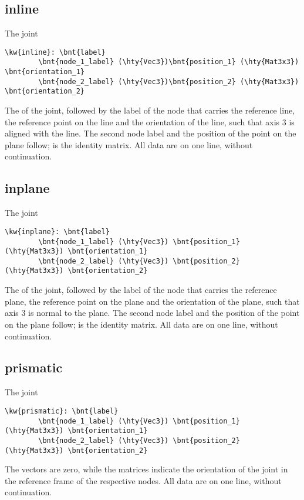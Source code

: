 \subsection{inline}
The  joint
\begin{Verbatim}[commandchars=\\\{\}]
    \kw{inline}: \bnt{label}
        \bnt{node_1_label} (\hty{Vec3})\bnt{position_1} (\hty{Mat3x3}) \bnt{orientation_1}
        \bnt{node_2_label} (\hty{Vec3})\bnt{position_2} (\hty{Mat3x3}) \bnt{orientation_2}
\end{Verbatim}
The  of the joint, followed by the label of the node
that carries the reference line, the reference point 
on the line and the orientation  of the line,
such that axis 3 is aligned with the line.
The second node label and the position of the point on the plane
follow;  is the identity matrix.
All data are on one line, without continuation.

\subsection{inplane}
The  joint
\begin{Verbatim}[commandchars=\\\{\}]
    \kw{inplane}: \bnt{label}
        \bnt{node_1_label} (\hty{Vec3}) \bnt{position_1} (\hty{Mat3x3}) \bnt{orientation_1}
        \bnt{node_2_label} (\hty{Vec3}) \bnt{position_2} (\hty{Mat3x3}) \bnt{orientation_2}
\end{Verbatim}
The  of the joint, followed by the label of the node
that carries the reference plane, the reference point 
on the plane and the orientation  of the plane,
such that axis 3 is normal to the plane.
The second node label and the position of the point on the plane
follow;  is the identity matrix.
All data are on one line, without continuation.

\subsection{prismatic}
The  joint
\begin{Verbatim}[commandchars=\\\{\}]
    \kw{prismatic}: \bnt{label}
        \bnt{node_1_label} (\hty{Vec3}) \bnt{position_1} (\hty{Mat3x3}) \bnt{orientation_1}
        \bnt{node_2_label} (\hty{Vec3}) \bnt{position_2} (\hty{Mat3x3}) \bnt{orientation_2}
\end{Verbatim}
The  vectors are zero,
while the  matrices indicate the orientation 
of the joint in the reference frame of the respective nodes.
All data are on one line, without continuation.

